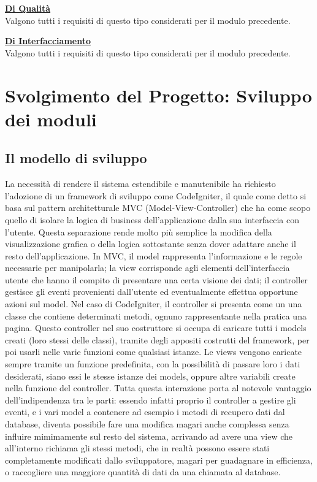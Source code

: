 \underline{\textbf{Di Qualit\`a}}\\
Valgono tutti i requisiti di questo tipo considerati per il modulo precedente.

\underline{\textbf{Di Interfacciamento}}\\
Valgono tutti i requisiti di questo tipo considerati per il modulo precedente.

\chapter{Svolgimento del Progetto: Sviluppo dei moduli}
\section{Il modello di sviluppo}
La necessit\`a di rendere il sistema estendibile e manutenibile ha richiesto l'adozione di un framework di sviluppo come CodeIgniter, il quale come detto si basa sul pattern architetturale MVC (Model-View-Controller) che ha come scopo quello di isolare la logica di business dell'applicazione dalla sua interfaccia con l'utente. Questa separazione rende molto pi\`u semplice la modifica della visualizzazione grafica o della logica sottostante senza dover adattare anche il resto dell'applicazione. In MVC, il model rappresenta l'informazione e le regole necessarie per manipolarla; la view corrisponde agli elementi dell'interfaccia utente che hanno il compito di presentare una certa visione dei dati; il controller gestisce gli eventi provenienti dall'utente ed eventualmente effettua opportune azioni sul model.
Nel caso di CodeIgniter, il controller si presenta come un una classe che contiene determinati metodi, ognuno rappresentante nella pratica una pagina. Questo controller nel suo costruttore si occupa di caricare tutti i models creati (loro stessi delle classi), tramite degli appositi costrutti del framework, per poi usarli nelle varie funzioni come qualsiasi istanze. Le views vengono caricate sempre tramite un funzione predefinita, con la possibilit\`a di passare loro i dati desiderati, siano essi le stesse istanze dei models, oppure altre variabili create nella funzione del controller. 
Tutta questa interazione porta al notevole vantaggio dell'indipendenza tra le parti: essendo infatti proprio il controller a gestire gli eventi, e i vari model a contenere ad esempio i metodi di recupero dati dal database, diventa possibile fare una modifica magari anche complessa senza influire mimimamente sul resto del sistema, arrivando ad avere una view che all'interno richiama gli stessi metodi, che in realt\`a possono essere stati completamente modificati dallo sviluppatore, magari per guadagnare in efficienza, o raccogliere una maggiore quantit\`a di dati da una chiamata al database.

